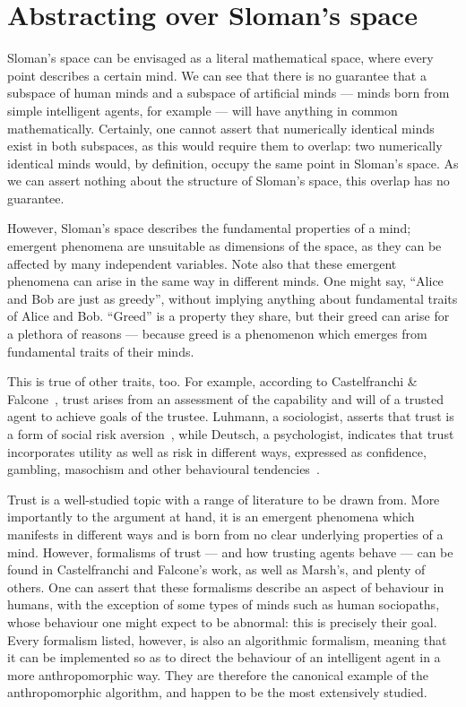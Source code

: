 \section{Abstracting over Sloman's space}

Sloman's space can be envisaged as a literal mathematical space, where every point describes a certain mind. We can see that there is no guarantee that a subspace of human minds and a subspace of artificial minds --- minds born from simple intelligent agents, for example --- will have anything in common mathematically. Certainly, one cannot assert that numerically identical minds exist in both subspaces, as this would require them to overlap: two numerically identical minds would, by definition, occupy the same point in Sloman's space. As we can assert nothing about the structure of Sloman's space, this overlap has no guarantee.\par

However, Sloman's space describes the fundamental properties of a mind; emergent phenomena are unsuitable as dimensions of the space, as they can be affected by many independent variables. Note also that these emergent phenomena can arise in the same way in different minds. One might say, ``Alice and Bob are just as greedy'', without implying anything about fundamental traits of Alice and Bob. ``Greed'' is a property they share, but their greed can arise for a plethora of reasons --- because greed is a phenomenon which emerges from fundamental traits of their minds.\par

This is true of other traits, too. For example, according to Castelfranchi \& Falcone~\citep{CastelfranchiSocialApproach}, trust arises from an assessment of the capability and will of a trusted agent to achieve goals of the trustee. Luhmann, a sociologist, asserts that trust is a form of social risk aversion~\citep{luhmann2000familiarity}, while Deutsch, a psychologist, indicates that trust incorporates utility as well as risk in different ways, expressed as confidence, gambling, masochism and other behavioural tendencies~\citep{deutsch1962cooperation}.\par

Trust is a well-studied topic with a range of literature to be drawn from. More importantly to the argument at hand, it is an emergent phenomena which manifests in different ways and is born from no clear underlying properties of a mind. However, formalisms of trust --- and how trusting agents behave --- can be found in Castelfranchi and Falcone's work, as well as Marsh's, and plenty of others. One can assert that these formalisms describe an aspect of behaviour in humans, with the exception of some types of minds such as human sociopaths, whose behaviour one might expect to be abnormal: this is precisely their goal. Every formalism listed, however, is also an algorithmic formalism, meaning that it can be implemented so as to direct the behaviour of an intelligent agent in a more anthropomorphic way. They are therefore the canonical example of the anthropomorphic algorithm, and happen to be the most extensively studied.\par

